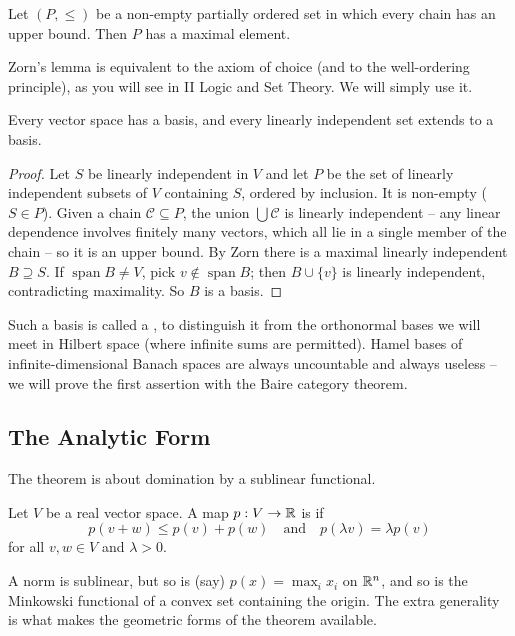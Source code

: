 \documentclass[a4paper]{scrartcl}
\newcommand{\spn}{\operatorname{span}}
\begin{document}
\begin{theorem}
	Let $(P, \leq)$ be a non-empty partially ordered set in which every chain has an upper bound. Then $P$ has a maximal element.
\end{theorem}

Zorn's lemma is equivalent to the axiom of choice (and to the well-ordering principle), as you will see in II Logic and Set Theory. We will simply use it.

\begin{proposition}
	Every vector space has a basis, and every linearly independent set extends to a basis.
\end{proposition}

\begin{proof}
	Let $S$ be linearly independent in $V$ and let $P$ be the set of linearly independent subsets of $V$ containing $S$, ordered by inclusion. It is non-empty ($S \in P$). Given a chain $\mathcal{C} \subseteq P$, the union $\bigcup \mathcal{C}$ is linearly independent -- any linear dependence involves finitely many vectors, which all lie in a single member of the chain -- so it is an upper bound. By Zorn there is a maximal linearly independent $B \supseteq S$. If $\spn B \neq V$, pick $v \notin \spn B$; then $B \cup \{v\}$ is linearly independent, contradicting maximality. So $B$ is a basis.
\end{proof}

Such a basis is called a , to distinguish it from the orthonormal bases we will meet in Hilbert space (where infinite sums are permitted). Hamel bases of infinite-dimensional Banach spaces are always uncountable and always useless -- we will prove the first assertion with the Baire category theorem.

\subsection{The Analytic Form}

The theorem is about domination by a sublinear functional.

\begin{definition}
	Let $V$ be a real vector space. A map $p : V \to \mathbb{R}$ is  if
	$$p(v + w) \leq p(v) + p(w) \quad \text{and} \quad p(\lambda v) = \lambda p(v)$$
	for all $v, w \in V$ and $\lambda > 0$.
\end{definition}

A norm is sublinear, but so is (say) $p(x) = \max_i x_i$ on $\mathbb{R}^n$, and so is the Minkowski functional of a convex set containing the origin. The extra generality is what makes the geometric forms of the theorem available.
\end{document}
